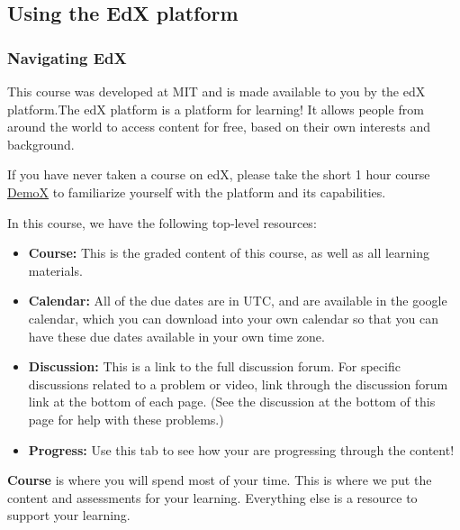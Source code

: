 \documentclass[pdftex, brazil, 12pt, twoside]{article}
\begin{document}
\subsection{Using the EdX platform}
\label{gs-edx}

\subsubsection{Navigating EdX}
\label{gs-edx-nav}

This course was developed at MIT and is made available to you by the edX platform.The edX platform is a platform for learning! It allows people from around the world to access content for free, based on their own interests and background.

If you have never taken a course on edX, please take the short 1 hour course
\href{https://www.edx.org/course/demox-edx-demox-1-0}{DemoX} to familiarize yourself with the platform and its capabilities.

In this course, we have the following top-level resources:

\begin{itemize}[noitemsep]
\item \textbf{Course:} This is the graded content of this course, as well as all learning materials.
\item \textbf{Calendar:} All of the due dates are in UTC, and are available in the google calendar,
  which you can download into your own calendar so that you can have these due dates available in your own time zone.
\item \textbf{Discussion:} This is a link to the full discussion forum. For specific discussions
  related to a problem or video, link through the discussion forum link at the bottom of each page.
  (See the discussion at the bottom of this page for help with these problems.)
\item \textbf{Progress:} Use this tab to see how your are progressing through the content!
\end{itemize}

\textbf{Course} is where you will spend most of your time. This is where we put the content and assessments for your learning. Everything else is a resource to support your learning.
\end{document}
